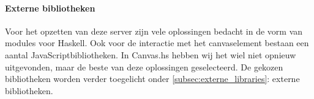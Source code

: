 \paragraph{Externe bibliotheken}
Voor het opzetten van deze server zijn vele oplossingen bedacht in de vorm van modules voor Haskell. Ook voor de interactie met het canvaselement bestaan een aantal JavaScriptbibliotheken.
In Canvas.hs hebben wij het wiel niet opnieuw uitgevonden, maar de beste van deze oplossingen geselecteerd. De gekozen bibliotheken worden verder toegelicht onder \autoref{subsec:externe_libraries}: externe bibliotheken.
